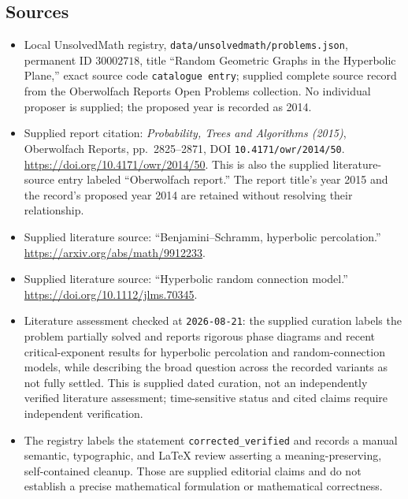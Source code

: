 \documentclass[11pt]{article}
\begin{document}
\subsection{Sources}
\begin{itemize}
\item Local UnsolvedMath registry, \texttt{data/unsolvedmath/problems.json}, permanent ID \(30002718\), title ``Random Geometric Graphs in the Hyperbolic Plane,'' exact source code \texttt{catalogue entry}; supplied complete source record from the Oberwolfach Reports Open Problems collection. No individual proposer is supplied; the proposed year is recorded as 2014.
\item Supplied report citation: \emph{Probability, Trees and Algorithms (2015)}, Oberwolfach Reports, pp.\ 2825--2871, DOI \texttt{10.4171/owr/2014/50}. \url{https://doi.org/10.4171/owr/2014/50}. This is also the supplied literature-source entry labeled ``Oberwolfach report.'' The report title's year 2015 and the record's proposed year 2014 are retained without resolving their relationship.
\item Supplied literature source: ``Benjamini--Schramm, hyperbolic percolation.'' \url{https://arxiv.org/abs/math/9912233}.
\item Supplied literature source: ``Hyperbolic random connection model.'' \url{https://doi.org/10.1112/jlms.70345}.
\item Literature assessment checked at \texttt{2026-08-21}: the supplied curation labels the problem partially solved and reports rigorous phase diagrams and recent critical-exponent results for hyperbolic percolation and random-connection models, while describing the broad question across the recorded variants as not fully settled. This is supplied dated curation, not an independently verified literature assessment; time-sensitive status and cited claims require independent verification.
\item The registry labels the statement \texttt{corrected\_verified} and records a manual semantic, typographic, and LaTeX review asserting a meaning-preserving, self-contained cleanup. Those are supplied editorial claims and do not establish a precise mathematical formulation or mathematical correctness.
\end{itemize}
\end{document}
